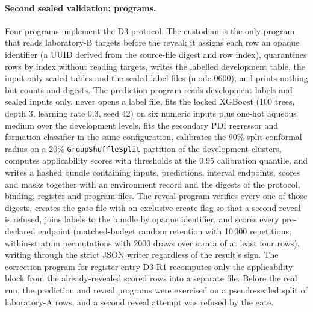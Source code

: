 \documentclass[11pt,a4paper]{article}
\begin{document}
\paragraph{Second sealed validation: programs.} Four programs implement the
D3 protocol. The custodian is the only program that reads laboratory-B
targets before the reveal; it assigns each row an opaque identifier (a UUID
derived from the source-file digest and row index), quarantines rows by index
without reading targets, writes the labelled development table, the
input-only sealed tables and the sealed label files (mode 0600), and prints
nothing but counts and digests. The prediction program reads development
labels and sealed inputs only, never opens a label file, fits the locked
XGBoost (100 trees, depth 3, learning rate 0.3, seed 42) on six numeric
inputs plus one-hot aqueous medium over the development levels, fits the
secondary PDI regressor and formation classifier in the same configuration,
calibrates the 90\% split-conformal radius on a 20\% \texttt{GroupShuffleSplit}
partition of the development clusters, computes applicability scores with
thresholds at the 0.95 calibration quantile, and writes a hashed bundle
containing inputs, predictions, interval endpoints, scores and masks together
with an environment record and the digests of the protocol, binding, register
and program files. The reveal program verifies every one of those digests,
creates the gate file with an exclusive-create flag so that a second reveal
is refused, joins labels to the bundle by opaque identifier, and scores every
pre-declared endpoint (matched-budget random retention with 10\,000
repetitions; within-stratum permutations with 2000 draws over strata of at
least four rows), writing through the strict JSON writer regardless of the
result's sign. The correction program for register entry D3-R1 recomputes
only the applicability block from the already-revealed scored rows into a
separate file. Before the real run, the prediction and reveal programs were
exercised on a pseudo-sealed split of laboratory-A rows, and a second reveal
attempt was refused by the gate.
\end{document}
